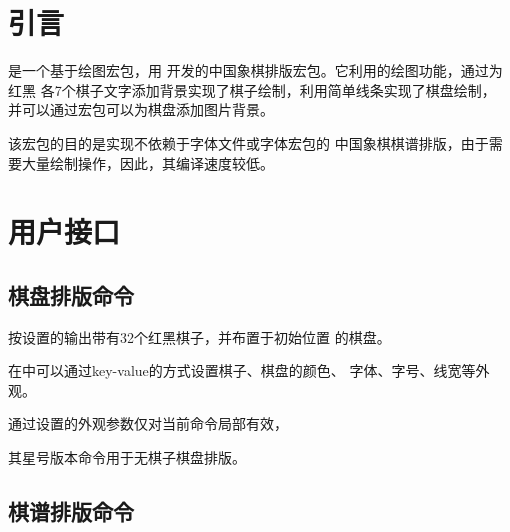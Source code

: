 \documentclass[full]{l3doc}
\begin{document}
\begin{documentation}

\section{引言}

是一个基于绘图宏包，用%
开发的中国象棋排版宏包。它利用的绘图功能，通过为红黑
各7个棋子文字添加背景实现了棋子绘制，利用简单线条实现了棋盘绘制，
并可以通过宏包可以为棋盘添加图片背景。

该宏包的目的是实现\textsf{不依赖于字体文件}或\textsf{字体宏包}的
中国象棋棋谱排版，由于需要大量绘制操作，因此，其编译速度较低。

\section{用户接口}

\subsection{棋盘排版命令}

\begin{function}{\cchessboard}
  \begin{syntax}
     
     
  \end{syntax}
\end{function}

  按设置的输出带有32个红黑棋子，并布置于初始位置
  的棋盘。

  在中可以通过key-value的方式设置棋子、棋盘的颜色、
  字体、字号、线宽等外观。

  通过设置的外观参数仅对当前命令局部有效，

  其星号版本命令用于无棋子棋盘排版。

\begin{SideBySideExample}[frame=single,numbers=left,
                xrightmargin=.60\linewidth,gobble=2]
  \centering
  \cchessboard\quad
  \cchessboard*
\end{SideBySideExample}

\subsection{棋谱排版命令}\label{subsec-cchessman}


\end{documentation}
\end{document}
